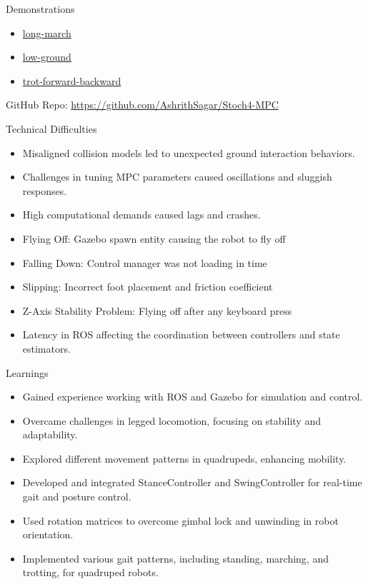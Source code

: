 \documentclass{beamer}
\newcommand{\videofolder}{videos/}
\begin{document}
\begin{frame}{Demonstrations}
    \begin{itemize}
        \item \href{\videofolder long-march.webm}{long-march}
        \item \href{\videofolder low-ground.mp4}{low-ground}
        \item \href{\videofolder trot-forward-backward.mp4}{trot-forward-backward}
    \end{itemize}
    \vspace*{2em}
    GitHub Repo: \url{https://github.com/AshrithSagar/Stoch4-MPC}
\end{frame}\normalfont

\begin{frame}{Technical Difficulties}
\begin{itemize}
    \item Misaligned collision models led to unexpected ground interaction behaviors.
    \item Challenges in tuning MPC parameters caused oscillations and sluggish responses.
    \item High computational demands caused lags and crashes.
    \item Flying Off: Gazebo spawn entity causing the robot to fly off
    \item Falling Down: Control manager was not loading in time
    \item Slipping: Incorrect foot placement and friction coefficient
    \item Z-Axis Stability Problem: Flying off after any keyboard press
    \item Latency in ROS affecting the coordination between controllers and state estimators.
\end{itemize}
\end{frame}\normalfont

\begin{frame}{Learnings}
\begin{itemize}
    \item Gained experience working with ROS and Gazebo for simulation and control.
    \item Overcame challenges in legged locomotion, focusing on stability and adaptability.
    \item Explored different movement patterns in quadrupeds, enhancing mobility.
    \item Developed and integrated StanceController and SwingController for real-time gait and posture control.
    \item Used rotation matrices to overcome gimbal lock and unwinding in robot orientation.
    \item Implemented various gait patterns, including standing, marching, and trotting, for quadruped robots.
\end{itemize}
\end{frame}\normalfont
\end{document}
